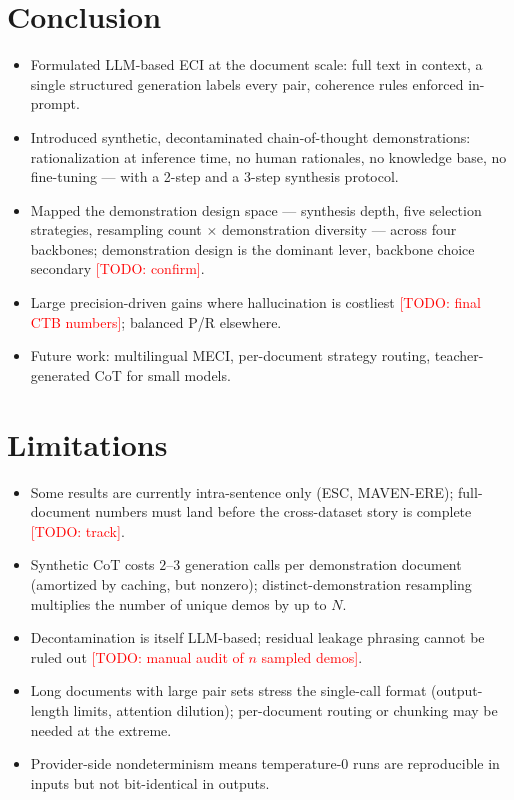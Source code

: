 \documentclass[11pt]{article}
\newcommand{\todo}[1]{\textcolor{red}{[TODO: #1]}}
\begin{document}
\section{Conclusion}
\begin{itemize}
  \item Formulated LLM-based ECI at the document scale: full text in context,
        a single structured generation labels every pair, coherence rules
        enforced in-prompt.
  \item Introduced synthetic, decontaminated chain-of-thought demonstrations:
        rationalization at inference time, no human rationales, no knowledge
        base, no fine-tuning --- with a 2-step and a 3-step synthesis protocol.
  \item Mapped the demonstration design space --- synthesis depth, five
        selection strategies, resampling count $\times$ demonstration
        diversity --- across four backbones; demonstration design is the
        dominant lever, backbone choice secondary \todo{confirm}.
  \item Large precision-driven gains where hallucination is costliest
        \todo{final CTB numbers}; balanced P/R elsewhere.
  \item Future work: multilingual MECI, per-document strategy routing,
        teacher-generated CoT for small models.
\end{itemize}

\section*{Limitations}
\begin{itemize}
  \item Some results are currently intra-sentence only (ESC, MAVEN-ERE);
        full-document numbers must land before the cross-dataset story is
        complete \todo{track}.
  \item Synthetic CoT costs $2$--$3$ generation calls per demonstration
        document (amortized by caching, but nonzero); distinct-demonstration
        resampling multiplies the number of unique demos by up to $N$.
  \item Decontamination is itself LLM-based; residual leakage phrasing cannot
        be ruled out \todo{manual audit of $n$ sampled demos}.
  \item Long documents with large pair sets stress the single-call format
        (output-length limits, attention dilution); per-document routing or
        chunking may be needed at the extreme.
  \item Provider-side nondeterminism means temperature-0 runs are reproducible
        in inputs but not bit-identical in outputs.
\end{itemize}
\end{document}
